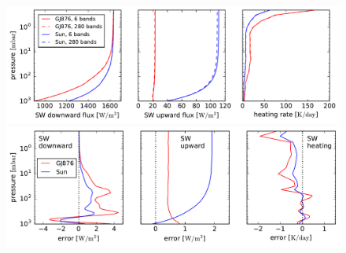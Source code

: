 \documentclass[11pt,numberedappendix,twocolappendix,]{emulateapj}
\begin{document}
\begin{figure}[!htb]
    \begin{center}
    \includegraphics[width=0.8\hsize]{fig/rad_comparison_AqOH0TLS_GJ876S12P21L40Q.pdf}
    \includegraphics[width=0.8\hsize]{fig/rad_comparison_diff_AqOH0TLS_GJ876S12P21L40Q.pdf}
    \end{center}
\caption{}                                                                                                             
\label{fig:socrates}
\end{figure}

\end{document}
